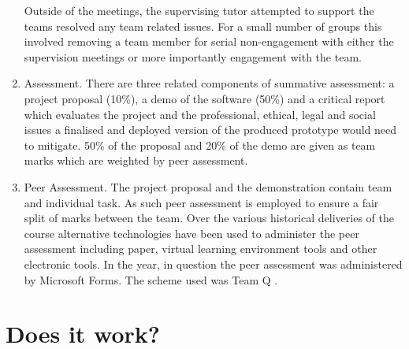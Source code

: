 \documentclass[sigconf, anonymous=true]{acmart}
\begin{document}
\begin{enumerate}
Outside of the meetings, the supervising tutor attempted to support the teams resolved any team related issues. For a small number of groups this involved removing a team member for serial non-engagement with either the supervision meetings or more importantly engagement with the team.
\item{Assessment.}
There are three related components of summative assessment: a project proposal (10\%), a demo of the software (50\%) and a critical report which evaluates the project and the professional, ethical, legal and social issues a finalised and deployed version of the produced prototype would need to mitigate. 50\% of the proposal and 20\% of the demo are given as team marks which are weighted by peer assessment.
\item{Peer Assessment.}
The project proposal and the demonstration contain team and individual task. As such peer assessment is employed to ensure a fair split of marks between the team. Over the various historical deliveries of the course alternative technologies have been used to administer the peer assessment including paper, virtual learning environment tools and other electronic tools. In the year, in question the peer assessment was administered by Microsoft Forms. The scheme used was Team Q \cite{Britton2017}.
\end{enumerate}

\section{Does it work?}	
\end{document}
